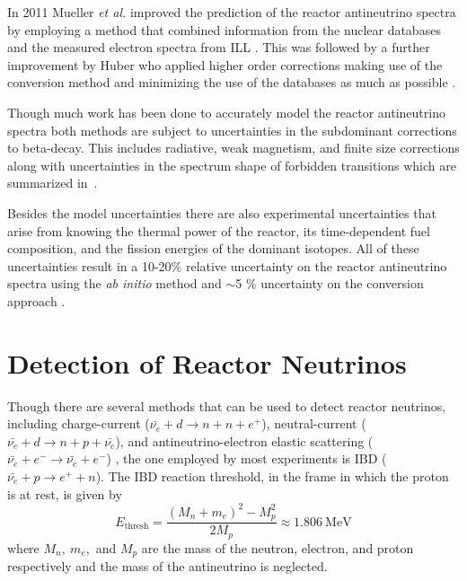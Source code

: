 In 2011 Mueller \textit{et al.} improved the prediction of the reactor antineutrino spectra by employing a method that combined information from the nuclear databases and the measured electron spectra from ILL \cite{Mueller}. 
This was followed by a further improvement by Huber who applied higher order corrections making use of the conversion method and minimizing the use of the databases as much as possible \cite{Huber}.

Though much work has been done to accurately model the reactor antineutrino spectra both methods are subject to uncertainties in the subdominant corrections to beta-decay. This includes radiative, weak magnetism, and finite size corrections along with uncertainties in the spectrum shape of forbidden transitions which are summarized in~\cite{HayesVogel}. 

Besides the model uncertainties there are also experimental uncertainties that arise from knowing the thermal power of the reactor, its time-dependent fuel composition, and the fission energies of the dominant isotopes.
All of these uncertainties result in a 10-20\% relative uncertainty on the reactor antineutrino spectra using the \textit{ab initio} method and $\sim$5 \% uncertainty on the conversion approach \cite{Qian:2018wid}.



\section{Detection of Reactor Neutrinos}

Though there are several methods that can be used to detect reactor neutrinos, including charge-current ($\bar{\nu_e} + d \rightarrow n + n + e^+$), neutral-current ($\bar{\nu_e} + d \rightarrow n + p + \bar{\nu_e}$), and antineutrino-electron elastic scattering ($\bar{\nu_e} + e^- \rightarrow \bar{\nu_e} + e^-$) \cite{SuperKOsc,SNO}, the one employed by most experiments is IBD ($\bar{\nu_e} + p \rightarrow e^+ + n$).
The IBD reaction threshold, in the frame in which the proton is at rest, is given by
\begin{equation}
	E_{\textrm{thresh}} = \frac{(M_n + m_e)^2 - M_p^2}{2M_p} \approx 1.806~\textrm{MeV}
\end{equation}
where $M_n, ~m_e,$ and $M_p$ are the mass of the neutron, electron, and proton respectively and the mass of the antineutrino is neglected.


